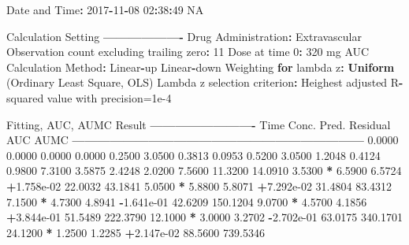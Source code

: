 \documentclass[12pt,]{krantz}
\newenvironment{Shaded}{\begin{snugshade}}{\end{snugshade}}
\newcommand{\KeywordTok}[1]{\textcolor[rgb]{0.13,0.29,0.53}{\textbf{#1}}}
\newcommand{\DecValTok}[1]{\textcolor[rgb]{0.00,0.00,0.81}{#1}}
\newcommand{\FloatTok}[1]{\textcolor[rgb]{0.00,0.00,0.81}{#1}}
\newcommand{\StringTok}[1]{\textcolor[rgb]{0.31,0.60,0.02}{#1}}
\newcommand{\OtherTok}[1]{\textcolor[rgb]{0.56,0.35,0.01}{#1}}
\newcommand{\ControlFlowTok}[1]{\textcolor[rgb]{0.13,0.29,0.53}{\textbf{#1}}}
\newcommand{\OperatorTok}[1]{\textcolor[rgb]{0.81,0.36,0.00}{\textbf{#1}}}
\newcommand{\NormalTok}[1]{#1}
\theoremstyle{definition}
\theoremstyle{definition}
\theoremstyle{definition}
\theoremstyle{remark}
\begin{document}
\begin{Shaded}
\begin{Highlighting}[]
{{{{{{{{\NormalTok{Date and Time}\OperatorTok{:}\StringTok{ }\DecValTok{2017}\OperatorTok{-}\DecValTok{11}\OperatorTok{-}\DecValTok{08} \DecValTok{02}\OperatorTok{:}\DecValTok{38}\OperatorTok{:}\DecValTok{49} \OtherTok{NA}

\NormalTok{Calculation Setting}
\OperatorTok{-------------------}
\NormalTok{Drug Administration}\OperatorTok{:}\StringTok{ }\NormalTok{Extravascular}
\NormalTok{Observation count excluding trailing zero}\OperatorTok{:}\StringTok{ }\DecValTok{11}
\NormalTok{Dose at time }\DecValTok{0}\OperatorTok{:}\StringTok{ }\DecValTok{320}\NormalTok{ mg}
\NormalTok{AUC Calculation Method}\OperatorTok{:}\StringTok{ }\NormalTok{Linear}\OperatorTok{-}\NormalTok{up Linear}\OperatorTok{-}\NormalTok{down}
\NormalTok{Weighting }\ControlFlowTok{for}\NormalTok{ lambda z}\OperatorTok{:}\StringTok{ }\KeywordTok{Uniform}\NormalTok{ (Ordinary Least Square, OLS)}
\NormalTok{Lambda z selection criterion}\OperatorTok{:}\StringTok{ }\NormalTok{Heighest adjusted R}\OperatorTok{-}\NormalTok{squared value with precision=}\FloatTok{1e-4}


\NormalTok{Fitting, AUC, AUMC Result}
\OperatorTok{-------------------------}
\StringTok{      }\NormalTok{Time         Conc.      Pred.   Residual       AUC       AUMC}
\OperatorTok{---------------------------------------------------------------------}
\StringTok{     }\FloatTok{0.0000}       \FloatTok{0.0000}                           \FloatTok{0.0000}     \FloatTok{0.0000}
     \FloatTok{0.2500}       \FloatTok{3.0500}                           \FloatTok{0.3813}     \FloatTok{0.0953}
     \FloatTok{0.5200}       \FloatTok{3.0500}                           \FloatTok{1.2048}     \FloatTok{0.4124}
     \FloatTok{0.9800}       \FloatTok{7.3100}                           \FloatTok{3.5875}     \FloatTok{2.4248}
     \FloatTok{2.0200}       \FloatTok{7.5600}                          \FloatTok{11.3200}    \FloatTok{14.0910}
     \FloatTok{3.5300} \OperatorTok{*}\StringTok{     }\FloatTok{6.5900}     \FloatTok{6.5724} \OperatorTok{+}\FloatTok{1.758e-02}    \FloatTok{22.0032}    \FloatTok{43.1841}
     \FloatTok{5.0500} \OperatorTok{*}\StringTok{     }\FloatTok{5.8800}     \FloatTok{5.8071} \OperatorTok{+}\FloatTok{7.292e-02}    \FloatTok{31.4804}    \FloatTok{83.4312}
     \FloatTok{7.1500} \OperatorTok{*}\StringTok{     }\FloatTok{4.7300}     \FloatTok{4.8941} \OperatorTok{-}\FloatTok{1.641e-01}    \FloatTok{42.6209}   \FloatTok{150.1204}
     \FloatTok{9.0700} \OperatorTok{*}\StringTok{     }\FloatTok{4.5700}     \FloatTok{4.1856} \OperatorTok{+}\FloatTok{3.844e-01}    \FloatTok{51.5489}   \FloatTok{222.3790}
    \FloatTok{12.1000} \OperatorTok{*}\StringTok{     }\FloatTok{3.0000}     \FloatTok{3.2702} \OperatorTok{-}\FloatTok{2.702e-01}    \FloatTok{63.0175}   \FloatTok{340.1701}
    \FloatTok{24.1200} \OperatorTok{*}\StringTok{     }\FloatTok{1.2500}     \FloatTok{1.2285} \OperatorTok{+}\FloatTok{2.147e-02}    \FloatTok{88.5600}   \FloatTok{739.5346}

}}}}}}}}
\end{Highlighting}
\end{Shaded}
\end{document}
